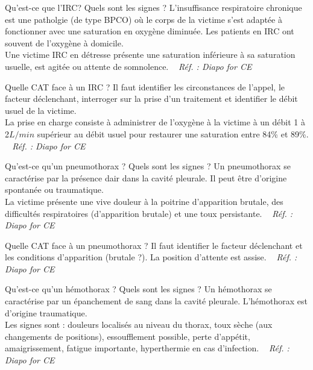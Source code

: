 \documentclass[grid,avery5371,landscape]{flashcards}
\makeatletter
\newcounter{nocarte}
\newcommand{\categ}[1]{%
  \def\@categ{#1}%
  \setcounter{nocarte}{0}%
}
\newcommand{\source}[1]{%
  \medskip
  \itshape%
   ~ \hfill Réf. : #1}
\makeatother
\begin{document}
\color[HTML]{01DF01}
\categ{CE-CP-REG}
\begin{flashcard}[bilan]{
 Qu'est-ce que l'IRC? Quels sont les signes ?   }
  L'insuffisance respiratoire chronique est une patholgie (de type BPCO) où le corps de la victime s'est adaptée à fonctionner avec une saturation en oxygène diminuée. Les patients en IRC ont souvent de l'oxygène à domicile. \\ Une victime IRC en détresse présente une saturation inférieure à sa saturation usuelle, est agitée ou attente de somnolence.
  \source{Diapo for CE }
\end{flashcard}


\color[HTML]{01DF01}
\categ{CE-CP-REG}
\begin{flashcard}[CAT]{
 Quelle CAT face à un IRC ?   }
  Il faut identifier les circonstances de l'appel, le facteur déclenchant, interroger sur la prise d'un traitement et identifier le débit usuel de la victime.\\ La prise en charge consiste à administrer de l'oxygène à la victime à un débit 1 à 2$L/min$ supérieur au débit usuel pour restaurer une saturation entre 84\% et 89\%.
  \source{Diapo for CE }
\end{flashcard}


\color[HTML]{01DF01}
\categ{CE-CP-REG}
\begin{flashcard}[bilan]{
 Qu'est-ce qu'un pneumothorax ? Quels sont les signes ?   }
  Un pneumothorax se caractérise par la présence dair dans la cavité pleurale. Il peut être d'origine spontanée ou traumatique.  \\
    La victime présente une vive douleur à la poitrine d'apparition brutale, des difficultés respiratoires (d'apparition brutale) et une toux persistante.
  \source{Diapo for CE }
\end{flashcard}


\color[HTML]{01DF01}
\categ{CE-CP-REG}
\begin{flashcard}[CAT]{
 Quelle CAT face à un pneumothorax ?   }
  Il faut identifier le facteur déclenchant et les conditions d'apparition (brutale ?). La position d'attente est assise.
  \source{Diapo for CE }
\end{flashcard}


\color[HTML]{01DF01}
\categ{CE-CP-REG}
\begin{flashcard}[bilan]{
 Qu'est-ce qu'un hémothorax ? Quels sont les signes ?   }
  Un hémothorax se caractérise par un épanchement de sang dans la cavité pleurale. L'hémothorax est d'origine traumatique.  \\
    Les signes sont : douleurs localisés au niveau du thorax, toux sèche (aux changements de positions), essoufflement possible, perte d'appétit, amaigrissement, fatigue importante, hyperthermie en cas d'infection.
  \source{Diapo for CE }
\end{flashcard}
\end{document}
